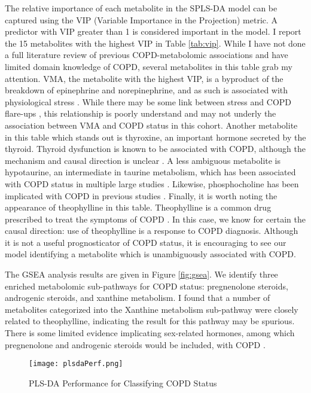 \documentclass{article}
\begin{document}
The relative importance of each metabolite in the SPLS-DA model can be captured using the VIP (Variable Importance in the Projection) metric. A predictor with VIP greater than 1 is considered important in the model. I report the 15 metabolites with the highest VIP in Table \ref{tab:vip}. While I have not done a full literature review of previous COPD-metabolomic associations and have limited domain knowledge of COPD, several metabolites in this table grab my attention. VMA, the metabolite with the highest VIP, is a byproduct of the breakdown of epinephrine and norepinephrine, and as such is associated with physiological stress \cite{chapman29OrganicAcid2020}. While there may be some link between stress and COPD flare-ups \cite{COPDManagingStress}, this relationship is poorly understand and may not underly the association between VMA and COPD status in this cohort. Another metabolite in this table which stands out is thyroxine, an important hormone secreted by the thyroid. Thyroid dysfunction is known to be associated with COPD, although the mechanism and causal direction is unclear \cite{milkowska-dymanowskaThyroidGlandChronic2017}. A less ambiguous metabolite is hypotaurine, an intermediate in taurine metabolism, which has been associated with COPD status in multiple large studies \cite{godboleMetabolomeFeaturesCOPD2022}. Likewise, phosphocholine has been implicated with COPD in previous studies \cite{gillenwaterMetabolomicProfilingReveals2021}. Finally, it is worth noting the appearance of theophylline in this table. Theophylline is a common drug prescribed to treat the symptoms of COPD \cite{TheophyllineMedlinePlusDrug}. In this case, we know for certain the causal direction: use of theophylline is a response to COPD diagnosis. Although it is not a useful prognosticator of COPD status, it is encouraging to see our model identifying a metabolite which is unambiguously associated with COPD.

The GSEA analysis results are given in Figure \ref{fig:gsea}. We identify three enriched metabolomic sub-pathways for COPD status: pregnenolone steroids, androgenic steroids, and xanthine metabolism. I found that a number of metabolites categorized into the Xanthine metabolism sub-pathway were closely related to theophylline, indicating the result for this pathway may be spurious. There is some limited evidence implicating sex-related hormones, among which pregnenolone and androgenic steroids would be included, with COPD \cite{tamRoleFemaleHormones2011}.

\begin{figure}
  \caption{PLS-DA Performance for Classifying COPD Status}
  \texttt{[image: plsdaPerf.png]}
  \centering
  \label{fig:perf}
  \end{figure}
\end{document}
